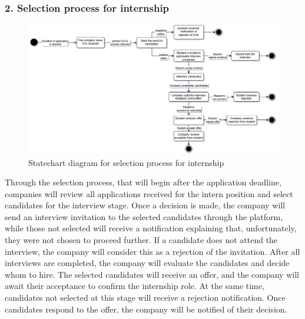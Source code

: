 \subsubsection{2. Selection process for internship}\label{subsubsec:internship_feedback}
\begin{figure}[H]
    \centering
    \includegraphics[width=1\textwidth]{Images/Selection_process.png}
    \caption{Statechart diagram for selection process for internship}\label{fig:statechart_selection_process_for_internship}
\end{figure}
Through the selection process, that will begin after the application deadline, companies will review all applications received for the intern position 
and select candidates for the interview stage. Once a decision is made, the company will send an interview invitation to the selected candidates through 
the platform, while those not selected will receive a notification explaining that, unfortunately, they were not chosen to proceed further.
If a candidate does not attend the interview, the company will consider this as a rejection of the invitation.
After all interviews are completed, the company will evaluate the candidates and decide whom to hire. The selected candidates will receive an offer, 
and the company will await their acceptance to confirm the internship role. At the same time, candidates not selected at this stage will receive a 
rejection notification. Once candidates respond to the offer, the company will be notified of their decision.

